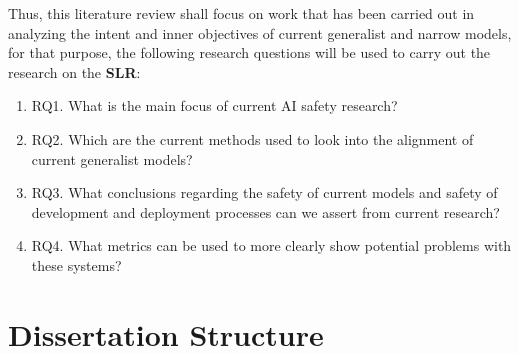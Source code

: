 Thus, this literature review shall focus on work that has been carried out in analyzing the intent and inner objectives of current generalist and narrow models, for that purpose, the following research questions will be used to carry out the research on the \textbf{SLR}:

\begin{enumerate}
	\item RQ1. What is the main focus of current AI safety research?
	\item RQ2. Which are the current methods used to look into the alignment of current generalist models?
	\item RQ3. What conclusions regarding the safety of current models and safety of development and deployment processes can we assert from current research?
	\item RQ4. What metrics can be used to more clearly show potential problems with these systems?
\end{enumerate}

\section{Dissertation Structure}

\newpage
